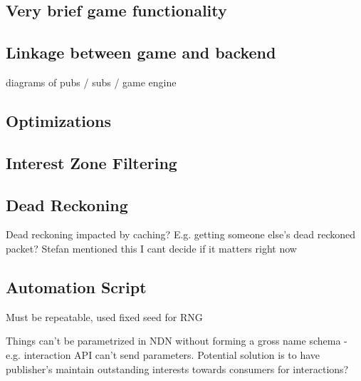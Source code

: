 \subsection{Very brief game functionality}
\subsection{Linkage between game and backend}
diagrams of pubs / subs / game engine
\subsection{Optimizations}
\subsection*{Interest Zone Filtering}
\subsection*{Dead Reckoning}
Dead reckoning impacted by caching? E.g. getting someone else's dead reckoned packet? Stefan mentioned this I cant decide if it matters right now

\subsection{Automation Script}
Must be repeatable, used fixed seed for RNG

Things can't be parametrized in NDN without forming a gross name schema - e.g. interaction API can't send parameters. Potential solution is to have publisher's maintain outstanding interests towards consumers for interactions?